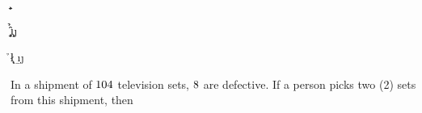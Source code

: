 


\FRACTIONSIMPLIFY\vbone\vbtwo\a\b

\SUBTRACT{}\c
\SUBTRACT{}\d
\SUBTRACT\vbtwo\vbone\x
\SUBTRACT{}\y

\FRACMULT\a\b\c\d\e\f

\vbone\vbtwo\g\h
{}\c\d\i\j

\FRACMULT\g\h\vbone\d\k\l
\FRACMULT\a\b\i\j\m\n


\question In a shipment of $104$ television sets, $8$ are defective. If a person picks 
two (2) sets from this shipment, then

\watchout

\ifprintanswers
\fi 

